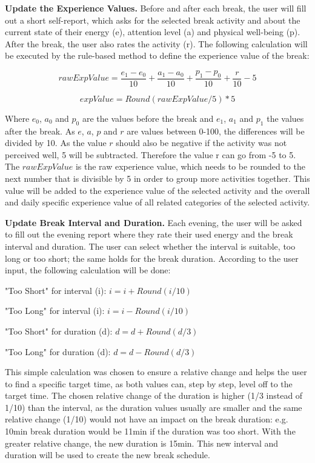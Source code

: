 \documentclass{hasel_thesis}
\begin{document}
\textbf{Update the Experience Values.} Before and after each break, the user will fill out a short self-report, which asks for the selected break activity and about the current state of their energy (e), attention level (a) and physical well-being (p). After the break, the user also rates the activity (r). The following calculation will be executed by the rule-based method to define the experience value of the break:

$$ rawExpValue = \frac{e_1- e_0}{10} + \frac{a_1- a_0}{10} + \frac{p_1-p_0}{10} + \frac{r}{10} -5$$

$$ expValue = Round(rawExpValue/5)*5$$

Where $e_0$, $a_0$ and $p_0$ are the values before the break and $e_1$, $a_1$ and $p_1$ the values after the break. As $e$, $a$, $p$ and $r$ are values between 0-100, the differences will be divided by 10. As the value $r$ should also be negative if the activity was not perceived well, 5 will be subtracted. Therefore the value r can go from -5 to 5. The $rawExpValue$ is the raw experience value, which needs to be rounded to the next number that is divisible by 5 in order to group more activities together. This value will be added to the experience value of the selected activity and the overall and daily specific experience value of all related categories of the selected activity.

\textbf{Update Break Interval and Duration.} Each evening, the user will be asked to fill out the evening report where they rate their used energy and the break interval and duration. The user can select whether the interval is suitable, too long or too short; the same holds for the break duration. According to the user input, the following calculation will be done:

"Too Short" for interval (i): $ i = i + Round(i/10) $

"Too Long" for interval (i): $ i = i - Round(i/10) $

"Too Short" for duration (d): $ d = d + Round(d/3) $

"Too Long" for duration (d): $ d = d - Round(d/3) $

This simple calculation was chosen to ensure a relative change and helps the user to find a specific target time, as both values can, step by step, level off to the target time. The chosen relative change of the duration is higher (1/3 instead of 1/10)  than the interval, as the duration values usually are smaller and the same relative change (1/10) would not have an impact on the break duration: e.g. 10min break duration would be 11min if the duration was too short. With the greater relative change, the new duration is 15min. This new interval and duration will be used to create the new break schedule.
\end{document}
